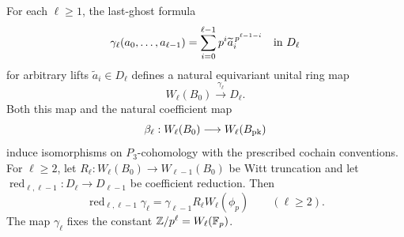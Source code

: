 \begin{lemma}\label{h3:lem:ghost-comparison}
For each \(\ell\geq1\), the last-ghost formula
\begin{equation}\label{h3:des:ghost-formula}
 \gamma_\ell(a_0,\ldots,a_{\ell-1})
   =\sum_{i=0}^{\ell-1}
       p^i\widetilde a_i^{\,p^{\ell-1-i}}\quad\hbox{in }D_\ell
\end{equation}
for arbitrary lifts \(\widetilde a_i\in D_\ell\) defines
a natural equivariant unital ring map
\[
 W_\ell(B_0)\xrightarrow{\gamma_\ell}D_\ell.
\]
Both this map and the natural coefficient map
\[
 \beta_\ell:W_\ell(B_0)\longrightarrow W_\ell(B_{\mathrm{pk}})
\]
induce isomorphisms on \(P_3\)-cohomology with the prescribed
cochain conventions.  For \(\ell\geq2\), let
\(R_\ell:W_\ell(B_0)\to W_{\ell-1}(B_0)\) be Witt truncation and
let \(\operatorname{red}_{\ell,\ell-1}:D_\ell\to D_{\ell-1}\)
be coefficient reduction.  Then
\begin{equation}\label{h3:des:ghost-transition}
 \operatorname{red}_{\ell,\ell-1}\gamma_\ell
     =\gamma_{\ell-1}R_\ell W_\ell(\phi_p)
       \qquad(\ell\geq2).
\end{equation}
The map \(\gamma_\ell\) fixes the constant
\(\mathbb Z/p^\ell=W_\ell(\mathbb F_p)\).
\end{lemma}

